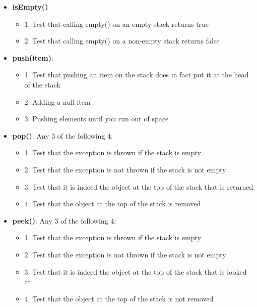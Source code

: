\documentclass[10pt]{article}\usepackage[nu]{esial}
\begin{document}
\begin{Reponse}
  \begin{itemize}
  \item \textbf{isEmpty()}
    \begin{itemize}
    \item 1. Test that calling empty() on an empty stack returns true
    \item 2. Test that calling empty() on a non-empty stack returns false
    \end{itemize}
  \item \textbf{push(item)}:
    \begin{itemize}
    \item 1. Test that pushing an item on the stack does in fact put it at the
      head of the stack
    \item 2. Adding a null item
    \item 3. Pushing elements until you run out of space
    \end{itemize}
  \item \textbf{pop()}: Any 3 of the following 4:
    \begin{itemize}
    \item 1. Test that the exception is thrown if the stack is empty
    \item 2. Test that the exception is not thrown if the stack is not empty
    \item 3. Test that it is indeed the object at the top of the stack that is
      returned
    \item 4. Test that the object at the top of the stack is removed
    \end{itemize}
  \item \textbf{peek()}: Any 3 of the following 4:
    \begin{itemize}
    \item 1. Test that the exception is thrown if the stack is empty
    \item 2. Test that the exception is not thrown if the stack is not empty
    \item 3. Test that it is indeed the object at the top of the stack that is
      looked at
    \item 4. Test that the object at the top of the stack is not removed
    \end{itemize}
  \end{itemize}
\end{Reponse}
\end{document}
